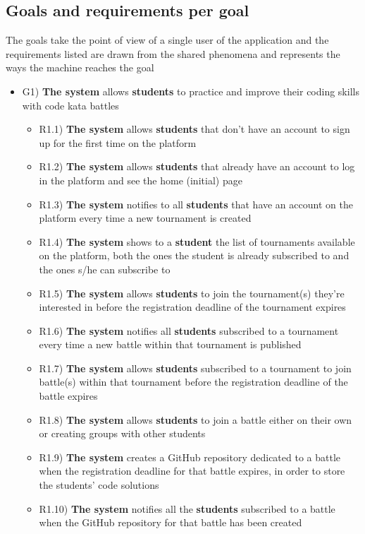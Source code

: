 	\subsection{Goals and requirements per goal}
	The goals take the point of view of a single user of the application and the requirements listed are drawn from the shared phenomena and represents the ways the machine reaches the goal
	\begin{itemize}
		\item G1) \textbf{The system} allows \textbf{students} to practice and improve their coding skills with code kata battles
		\begin{itemize}
			\item R1.1) \textbf{The system} allows \textbf{students} that don't have an account to sign up for the first time on the platform
			\item R1.2) \textbf{The system} allows \textbf{students} that already have an account to log in the platform and see the home (initial) page
			\item R1.3) \textbf{The system} notifies to all \textbf{students} that have an account on the platform every time a new tournament is created
			\item R1.4) \textbf{The system} shows to a \textbf{student} the list of tournaments available on the platform, both the ones the student is already subscribed to and the ones s/he can subscribe to
			\item R1.5) \textbf{The system} allows \textbf{students} to join the tournament(s) they’re interested in before the registration deadline of the tournament expires
			\item R1.6) \textbf{The system} notifies all \textbf{students} subscribed to a tournament every time a new battle within that tournament is published
			\item R1.7) \textbf{The system} allows \textbf{students} subscribed to a tournament to join battle(s) within that tournament before the registration deadline of the battle expires
			\item R1.8) \textbf{The system} allows \textbf{students} to join a battle either on their own or creating groups with other students
			\item R1.9) \textbf{The system} creates a GitHub repository dedicated to a battle when the registration deadline for that battle expires, in order to store the students’ code solutions
			\item R1.10) \textbf{The system} notifies all the \textbf{students} subscribed to a battle when the GitHub repository for that battle has been created

\end{itemize}
\end{itemize}
